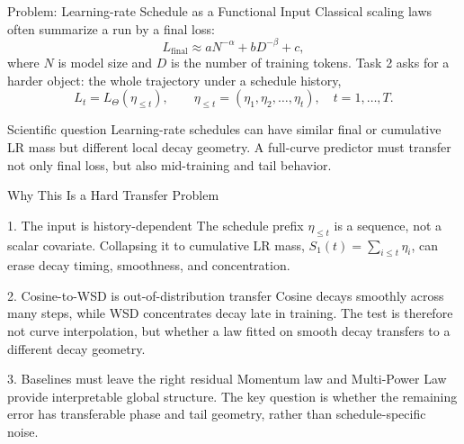 \documentclass[fontset=fandol,aspectratio=169,10pt]{ctexbeamer}
\begin{document}
\begin{frame}{Problem: Learning-rate Schedule as a Functional Input}
  Classical scaling laws often summarize a run by a final loss:
  \[
    L_{\mathrm{final}} \approx aN^{-\alpha}+bD^{-\beta}+c,
  \]
  where \(N\) is model size and \(D\) is the number of training tokens.
  Task 2 asks for a harder object: the whole trajectory under a schedule history,
  \[
    L_t = L_{\Theta}(\eta_{\le t}),\qquad
    \eta_{\le t}=(\eta_1,\eta_2,\ldots,\eta_t),\quad t=1,\ldots,T .
  \]

  \vspace{0.3em}
  \begin{block}{Scientific question}
    Learning-rate schedules can have similar final or cumulative LR mass but
    different local decay geometry. A full-curve predictor must transfer not
    only final loss, but also mid-training and tail behavior.
  \end{block}
\end{frame}

\begin{frame}{Why This Is a Hard Transfer Problem}
  \begin{block}{1. The input is history-dependent}
    The schedule prefix \(\eta_{\le t}\) is a sequence, not a scalar covariate.
    Collapsing it to cumulative LR mass,
    \(S_1(t)=\sum_{i\le t}\eta_i\), can erase decay timing, smoothness, and
    concentration.
  \end{block}

  \begin{block}{2. Cosine-to-WSD is out-of-distribution transfer}
    Cosine decays smoothly across many steps, while WSD concentrates decay
    late in training. The test is therefore not curve interpolation, but
    whether a law fitted on smooth decay transfers to a different decay geometry.
  \end{block}

  \begin{block}{3. Baselines must leave the right residual}
    Momentum law and Multi-Power Law provide interpretable global structure.
    The key question is whether the remaining error has transferable phase and
    tail geometry, rather than schedule-specific noise.
  \end{block}
\end{frame}
\end{document}
